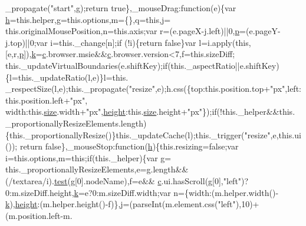 \begin{DoxyCode}
      \_propagate(\textcolor{stringliteral}{"start"},g);\textcolor{keywordflow}{return} \textcolor{keyword}{true}\},\_mouseDrag:\textcolor{keyword}{function}(e)\{var \hyperlink{all__1a_8js_aebecdaf2444e2be39f4804412d6a3bf8}{h}=this.helper,g=this.options,m=\{\},q=\textcolor{keyword}{this},j=
      this.originalMousePosition,n=this.axis;var r=(e.pageX-j.left)||0,\hyperlink{jquery_8js_a2335e57f79b6acfb6de59c235dc8a83e}{p}=(e.pageY-j.top)||0;var i=this.\_change[n];\textcolor{keywordflow}{if}
      (!i)\{\textcolor{keywordflow}{return} \textcolor{keyword}{false}\}var l=i.apply(\textcolor{keyword}{this},[e,r,\hyperlink{jquery_8js_a2335e57f79b6acfb6de59c235dc8a83e}{p}]),\hyperlink{jquery_8js_ab26645c014aa005ecedef329ecf58c99}{k}=\hyperlink{jquery_8js_ad171626e81625b5e9f5cb177a3a8fb1c}{c}.browser.msie&&\hyperlink{jquery_8js_ad171626e81625b5e9f5cb177a3a8fb1c}{c}.browser.version<7,f=this.sizeDiff;
      this.\_updateVirtualBoundaries(e.shiftKey);\textcolor{keywordflow}{if}(this.\_aspectRatio||e.shiftKey)\{l=this.\_updateRatio(l,e)\}l=this.
      \_respectSize(l,e);this.\_propagate(\textcolor{stringliteral}{"resize"},e);h.css(\{top:this.position.top+\textcolor{stringliteral}{"px"},left:this.position.left+\textcolor{stringliteral}{"px"},
      width:this.\hyperlink{all__15_8js_acbd9773931ec61196e11d59d52b43cb3}{size}.width+\textcolor{stringliteral}{"px"},\hyperlink{styr_2styr_2main_8c_a48083b65ac9a863566dc3e3fff09a5b4}{height}:this.\hyperlink{all__15_8js_acbd9773931ec61196e11d59d52b43cb3}{size}.height+\textcolor{stringliteral}{"px"}\});\textcolor{keywordflow}{if}(!this.\_helper&&this.
      \_proportionallyResizeElements.length)\{this.\_proportionallyResize()\}this.\_updateCache(l);this.\_trigger(\textcolor{stringliteral}{"resize"},e,this.ui());\textcolor{keywordflow}{
      return} \textcolor{keyword}{false}\},\_mouseStop:\textcolor{keyword}{function}(\hyperlink{all__1a_8js_aebecdaf2444e2be39f4804412d6a3bf8}{h})\{this.resizing=\textcolor{keyword}{false};var i=this.options,m=\textcolor{keyword}{this};\textcolor{keywordflow}{if}(this.\_helper)\{var g=
      this.\_proportionallyResizeElements,e=g.length&&(/textarea/i).\hyperlink{inv__mpu_8c_a1e8f8b1ef7fb2c429e1ce7c2f9985530}{test}(g[0].nodeName),f=e&&
      \hyperlink{jquery_8js_ad171626e81625b5e9f5cb177a3a8fb1c}{c}.ui.hasScroll(g[0],\textcolor{stringliteral}{"left"})?0:m.sizeDiff.height,\hyperlink{jquery_8js_ab26645c014aa005ecedef329ecf58c99}{k}=e?0:m.sizeDiff.width;var n=\{width:(m.helper.width()-
      \hyperlink{jquery_8js_ab26645c014aa005ecedef329ecf58c99}{k}),\hyperlink{styr_2styr_2main_8c_a48083b65ac9a863566dc3e3fff09a5b4}{height}:(m.helper.height()-f)\},j=(parseInt(m.element.css(\textcolor{stringliteral}{"left"}),10)+(m.position.left-m.

\end{DoxyCode}
